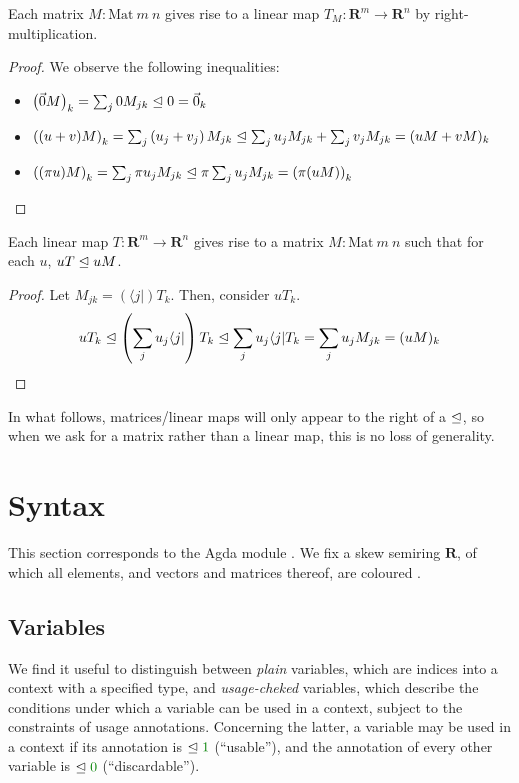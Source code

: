 \documentclass[submission,copyright,creativecommons]{eptcs}
\begin{document}
\begin{lemma}
  Each matrix $M : \mathrm{Mat}~m~n$ gives rise to a linear map
  $T_M : \mathbf R^m \to \mathbf R^n$ by right-multiplication.
\end{lemma}
\begin{proof}
  We observe the following inequalities:
  \begin{itemize}
  \item $\left(\vec 0M\right)_{k} = \sum_j 0M_{jk} \trianglelefteq 0 = \vec 0_{k}$
  \item $\left((u + v)M\right)_{k} = \sum_j \left(u_j + v_j\right)M_{jk} \trianglelefteq
    \sum_j u_jM_{jk} + \sum_j v_jM_{jk} = (uM + vM)_{k}$
  \item $\left((\pi u)M\right)_{k} = \sum_j \pi u_jM_{jk} \trianglelefteq
    \pi\sum_j u_jM_{jk} = \left(\pi(uM)\right)_{k}$
  \end{itemize}
\end{proof}

\begin{lemma}
  Each linear map $T : \mathbf R^m \to \mathbf R^n$ gives rise to a matrix
  $M : \mathrm{Mat}~m~n$ such that for each $u$, $uT \trianglelefteq uM$.
\end{lemma}
\begin{proof}
  Let $M_{jk} = (\langle j \rvert)T_k$.
  Then, consider $uT_k$.
  \[
    uT_k \trianglelefteq \left(\sum_j u_j\langle j \rvert\right)T_k
    \trianglelefteq \sum_j u_j\langle j \rvert T_k
    = \sum_j u_j M_{jk} = (uM)_k
  \]
\end{proof}

In what follows, matrices/linear maps will only appear to the right of a
$\trianglelefteq$, so when we ask for a matrix rather than a linear map, this is no loss
of generality.

\section{Syntax}\label{sec:syntax}

This section corresponds to the Agda module .
We fix a skew semiring $\mathbf R$, of which all elements, and vectors and
matrices thereof, are coloured .

\subsection{Variables}

We find it useful to distinguish between \emph{plain} variables, which are
indices into a context with a specified type, and \emph{usage-cheked} variables,
which describe the conditions under which a variable can be used in a context,
subject to the constraints of usage annotations.
Concerning the latter, a variable may be used in a context if its annotation is
$\subres \rescomment 1$ (``usable''), and the annotation of every other variable
is $\subres \rescomment 0$ (``discardable'').
\end{document}
